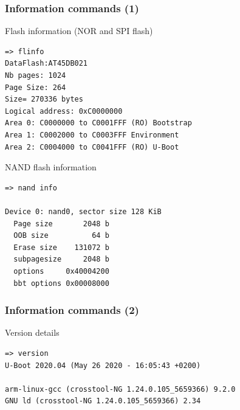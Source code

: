 \begin{frame}[fragile]
  \frametitle{Information commands (1)}

\begin{block}{Flash information (NOR and SPI flash)}
{\tiny
\begin{verbatim}
=> flinfo
DataFlash:AT45DB021
Nb pages: 1024
Page Size: 264
Size= 270336 bytes
Logical address: 0xC0000000
Area 0: C0000000 to C0001FFF (RO) Bootstrap
Area 1: C0002000 to C0003FFF Environment
Area 2: C0004000 to C0041FFF (RO) U-Boot
\end{verbatim}}
\end{block}

\begin{block}{NAND flash information}
{\tiny
\begin{verbatim}
=> nand info

Device 0: nand0, sector size 128 KiB
  Page size       2048 b
  OOB size          64 b
  Erase size    131072 b
  subpagesize     2048 b
  options     0x40004200
  bbt options 0x00008000
\end{verbatim}}
\end{block}
\end{frame}

\begin{frame}[fragile]
  \frametitle{Information commands (2)}
\begin{block}{Version details}
{\small
\begin{verbatim}
=> version
U-Boot 2020.04 (May 26 2020 - 16:05:43 +0200)

arm-linux-gcc (crosstool-NG 1.24.0.105_5659366) 9.2.0
GNU ld (crosstool-NG 1.24.0.105_5659366) 2.34
\end{verbatim}}
\end{block}
\end{frame}


